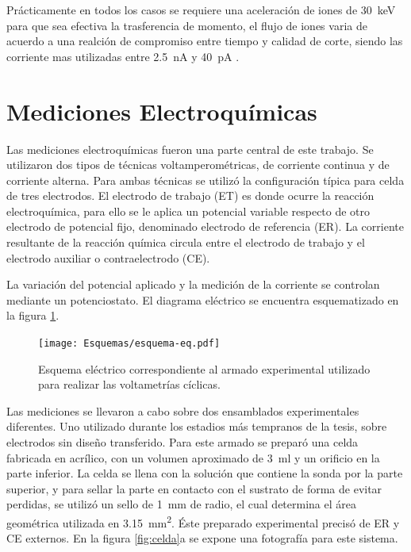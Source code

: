 		Prácticamente en todos los casos se requiere una aceleración de iones de \SI{30}{\kilo\electronvolt} para que sea efectiva la trasferencia de momento, el flujo de iones varia de acuerdo a una realción de compromiso entre tiempo y calidad de corte, siendo las corriente mas utilizadas entre \SI{2.5}{\nano\ampere} y \SI{40}{\pico\ampere} \cite{Orloff2003,Reyntjens2001}.

\section{Mediciones Electroquímicas}\label{sec:medidas_eq}
		
			Las mediciones electroquímicas fueron una parte central de este trabajo. Se utilizaron dos tipos de técnicas voltamperométricas, de corriente continua y de corriente alterna. 	%
			Para ambas técnicas se utilizó la configuración típica para celda de tres electrodos.\cite{Wi2000} El electrodo de trabajo (ET) es donde ocurre la reacción electroquímica, para ello se le aplica un potencial variable respecto de otro electrodo de potencial fijo, denominado electrodo de referencia (ER). La corriente resultante de la reacción química circula entre el electrodo de trabajo y el electrodo auxiliar o contraelectrodo (CE). 
		
			La variación del potencial aplicado y la medición de la corriente se controlan mediante un potenciostato. El diagrama eléctrico se encuentra esquematizado en la figura \ref{fig:eq-circuito}.

				\begin{figure}[h!]
			 		  \begin{center}
			 		  \texttt{[image: Esquemas/esquema-eq.pdf]}
			 		  \caption[Circuito eléctrico EQ]{Esquema eléctrico correspondiente al armado experimental utilizado para realizar las voltametrías cíclicas.}
			 		  \label{fig:eq-circuito}
			 		  \end{center}
			 		  \end{figure}

			Las mediciones se llevaron a cabo sobre dos ensamblados experimentales diferentes. Uno utilizado durante los estadios más tempranos de la tesis, sobre electrodos sin diseño transferido. Para este armado se preparó una celda fabricada en acrílico, con un volumen aproximado de \SI{3}{\ml} y un orificio en la parte inferior. La celda se llena con la solución que contiene la sonda por la parte superior, y para sellar la parte en contacto con el sustrato de forma de evitar perdidas, se utilizó un sello de \SI{1}{\mm} de radio, el cual determina el área geométrica utilizada en \SI{3.15}{\mm^{2}}. Éste preparado experimental precisó de ER y CE externos. En la figura \ref{fig:celda}a se expone una fotografía para este sistema. 

